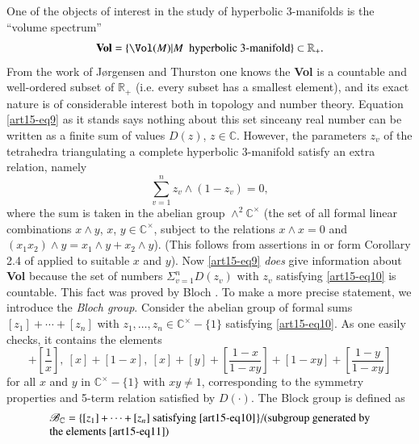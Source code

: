 One of the objects of interest in the study of hyperbolic 3-manifolds is the ``volume spectrum''
$$
\mathbf{Vol}=\{\Vol(M)|M\text{~ hyperbolic 3-manifold}\}\subset \mathbb{R}_{+}.
$$
From the work of J{\o}rgensen and Thurston one knows the {\bf Vol} is a countable and well-ordered subset of $\mathbb{R}_{+}$ (i.e. every subset has a smallest element), and its exact nature is of considerable interest both in topology and number theory. Equation \eqref{art15-eq9} as it stands says nothing about this set since\pageoriginale any real number can be written as a finite sum of values $D(z)$, $z\in \mathbb{C}$. However, the parameters $z_{v}$ of the tetrahedra triangulating a complete hyperbolic 3-manifold satisfy an extra relation, namely
\begin{equation}
\sum\limits^{n}_{v=1}z_{v}\wedge (1-z_{v})=0,\label{art15-eq10}
\end{equation}
where the sum is taken in the abelian group $\wedge^{2}\mathbb{C}^{\times}$ (the set of all formal linear combinations $x\wedge y$, $x$, $y\in \mathbb{C}^{\times}$, subject to the relations $x\wedge x=0$ and $(x_{1}x_{2})\wedge y=x_{1}\wedge y+x_{2}\wedge y$). (This follows from assertions in \cite{art15-key3} or form Corollary 2.4 of \cite{art15-key5} applied to suitable $x$ and $y$). Now \eqref{art15-eq9} {\em does} give information about {\bf Vol} because the set of numbers $\Sigma^{n}_{v=1}D(z_{v})$ with $z_{v}$ satisfying \eqref{art15-eq10} is countable. This fact was proved by Bloch \cite{art15-key1}. To make a more precise statement, we introduce the {\em Bloch group}. Consider the abelian group of formal sums $[z_{1}]+\cdots+[z_{n}]$ with $z_{1},\ldots,z_{n}\in \mathbb{C}^{\times}-\{1\}$ satisfying \eqref{art15-eq10}. As one easily checks, it contains the elements
\begin{equation}
[x]+\left[\frac{1}{x}\right], \ [x]+[1-x], \ [x]+[y]+\left[\frac{1-x}{1-xy}\right]+[1-xy]+\left[\frac{1-y}{1-xy}\right]\label{art15-eq11}
\end{equation}
for all $x$ and $y$ in $\mathbb{C}^{\times}-\{1\}$ with $xy\neq 1$, corresponding to the symmetry properties and 5-term relation satisfied by $D(\cdot)$. The Block group is defined as
\begin{equation}
\begin{array}{p{10cm}}
$\mathscr{B}_{\mathbb{C}}=\{[z_{1}]+\cdots+[z_{n}]$ satisfying \eqref{art15-eq10}\}/(subgroup generated by the elements \eqref{art15-eq11})
\end{array}\label{art15-eq12}
\end{equation}
